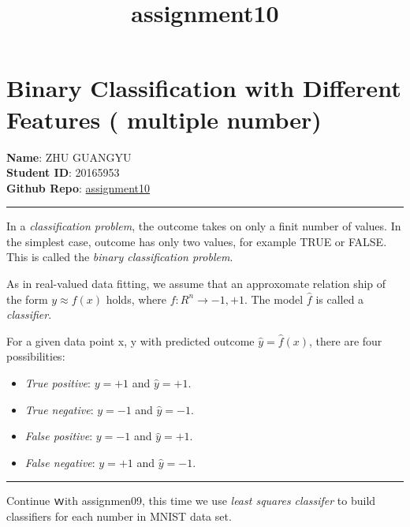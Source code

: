 \documentclass[11pt]{article}
\title{assignment10}
\providecommand{\tightlist}{%
      \setlength{\itemsep}{0pt}\setlength{\parskip}{0pt}}
\begin{document}
    
    
    \maketitle
    
    

    
    \section{Binary Classification with Different Features ( multiple
number)}\label{binary-classification-with-different-features-multiple-number}

\textbf{Name}: ZHU GUANGYU\\
\textbf{Student ID}: 20165953\\
\textbf{Github Repo}:
\href{https://github.com/z1ggy-o/cv_assignment/tree/master/assignment10}{assignment10}

\begin{center}\rule{0.5\linewidth}{\linethickness}\end{center}

In a \emph{classification problem}, the outcome takes on only a finit
number of values. In the simplest case, outcome has only two values, for
example TRUE or FALSE. This is called the \emph{binary classification
problem}.

As in real-valued data fitting, we assume that an approxomate relation
ship of the form \(y \approx f(x)\) holds, where
\(f: R^{n} \rightarrow {-1, +1}\). The model \(\hat{f}\) is called a
\emph{classifier}.

For a given data point x, y with predicted outcome
\(\hat{y} = \hat{f}(x)\), there are four possibilities:

\begin{itemize}
\tightlist
\item
  \emph{True positive}: \(y = +1\) and \(\hat{y} = +1\).
\item
  \emph{True negative}: \(y = -1\) and \(\hat{y} = -1\).
\item
  \emph{False positive}: \(y = -1\) and \(\hat{y} = +1\).
\item
  \emph{False negative}: \(y = +1\) and \(\hat{y} = -1\).
\end{itemize}

\begin{center}\rule{0.5\linewidth}{\linethickness}\end{center}

Continue ｗith assignmen09, this time we use \emph{least squares
classifer} to build classifiers for each number in MNIST data set.
\end{document}
